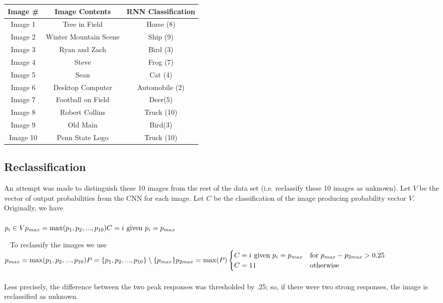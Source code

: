 \documentclass[11pt,english]{article}
\begin{document}
\begin{tabular}{ | c | c | c |}
  \hline
  Image \# & Image Contents & RNN Classification \\
  \hline		
  Image 1 & Tree in Field & Horse (8) \\
  Image 2 & Winter Mountain Scene & Ship (9) \\
  Image 3 & Ryan and Zach & Bird (3) \\
  Image 4 & Steve & Frog (7) \\
  Image 5 & Sean & Cat (4) \\
  Image 6 & Desktop Computer & Automobile (2) \\
  Image 7 & Football on Field & Deer(5) \\
  Image 8 & Robert Collins & Truck (10) \\
  Image 9 & Old Main & Bird(3) \\
  Image 10 & Penn State Logo & Truck (10)\\
  \hline  
\end{tabular}

\subsection{Reclassification}
An attempt was made to distinguish these 10 images from the rest of the data set (i.e. reclassify these 10 images as unknown).  Let $V$ be the vector of output probabilities from the CNN for each image.  Let $C$ be the classification of the image producing probability vector $V$.  Originally, we have\\~\\
\begin{math}
p_i \in V \\
p_{max} = \max(p_1, p_2,...,p_{10}) \\
C = i $ given $ p_i = p_{max}
\end{math}

~\newline\noindent
To reclassify the images we use\\
\noindent
\begin{math}
p_{max} = \max(p_1,p_2,...,p_{10}) \\
P = \{p_1,p_2,...,p_{10}\} \setminus \{p_{max}\} \\
p_{2max} = \max(P) \\~\\
\begin{cases}
C = i $ given $ p_i = p_{max} & $for	$ p_{max} - p_{2max} > 0.25 \\
C = 11 & $otherwise$
\end{cases}
\end{math}
~\\~\\
Less precisely, the difference between the two peak responses was thresholded by .25; so, if there were two strong responses, the image is reclassified as unknown.
\end{document}
